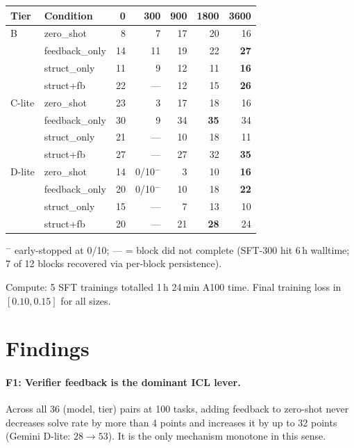 \documentclass[11pt]{article}
\begin{document}
\begin{center}\small
\begin{tabular}{llrrrrr}
\toprule
\textbf{Tier} & \textbf{Condition} & \textbf{0} & \textbf{300} & \textbf{900} & \textbf{1800} & \textbf{3600} \\
\midrule
B & zero\_shot & 8 & 7 & 17 & 20 & 16 \\
  & feedback\_only & 14 & 11 & 19 & 22 & \textbf{27} \\
  & struct\_only & 11 & 9 & 12 & 11 & \textbf{16} \\
  & struct+fb & 22 & --- & 12 & 15 & \textbf{26} \\
\midrule
C-lite & zero\_shot & 23 & 3 & 17 & 18 & 16 \\
  & feedback\_only & 30 & 9 & 34 & \textbf{35} & 34 \\
  & struct\_only & 21 & --- & 10 & 18 & 11 \\
  & struct+fb & 27 & --- & 27 & 32 & \textbf{35} \\
\midrule
D-lite & zero\_shot & 14 & 0/10$^{-}$ & 3 & 10 & \textbf{16} \\
  & feedback\_only & 20 & 0/10$^{-}$ & 10 & 18 & \textbf{22} \\
  & struct\_only & 15 & --- & 7 & 13 & 10 \\
  & struct+fb & 20 & --- & 21 & \textbf{28} & 24 \\
\bottomrule
\end{tabular}
\end{center}
{\small $^{-}$ early-stopped at 0/10; --- = block did not complete (SFT-300 hit 6\,h walltime; 7 of 12 blocks recovered via per-block persistence).}

Compute: 5 SFT trainings totalled 1\,h 24\,min A100 time. Final training loss in $[0.10, 0.15]$ for all sizes.

\section{Findings}

\paragraph{F1: Verifier feedback is the dominant ICL lever.} Across all 36 (model, tier) pairs at 100 tasks, adding feedback to zero-shot never decreases solve rate by more than 4 points and increases it by up to 32 points (Gemini D-lite: $28\to53$). It is the only mechanism monotone in this sense.
\end{document}
